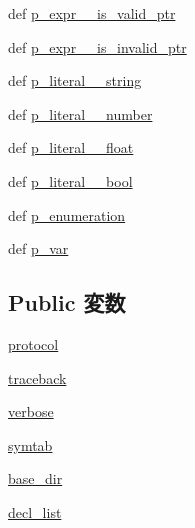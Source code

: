 \begin{DoxyCompactItemize}
\item 
def \hyperlink{classslicc_1_1parser_1_1SLICC_a4986f46b64e780add34eae04d1e4647e}{p\_\-expr\_\-\_\-is\_\-valid\_\-ptr}
\item 
def \hyperlink{classslicc_1_1parser_1_1SLICC_ae494093204d4dfecd7df80dc30f4e77c}{p\_\-expr\_\-\_\-is\_\-invalid\_\-ptr}
\item 
def \hyperlink{classslicc_1_1parser_1_1SLICC_afb56a210832d7241c7b30a71208f3e78}{p\_\-literal\_\-\_\-string}
\item 
def \hyperlink{classslicc_1_1parser_1_1SLICC_a7461ee14365de567c127d4ab8945d4b1}{p\_\-literal\_\-\_\-number}
\item 
def \hyperlink{classslicc_1_1parser_1_1SLICC_a96dd60ba8acf634524837855abefeebb}{p\_\-literal\_\-\_\-float}
\item 
def \hyperlink{classslicc_1_1parser_1_1SLICC_ab0a9703c95e703c1e2664fd532e19951}{p\_\-literal\_\-\_\-bool}
\item 
def \hyperlink{classslicc_1_1parser_1_1SLICC_a226b90fa8461df80629cd8b1c2864844}{p\_\-enumeration}
\item 
def \hyperlink{classslicc_1_1parser_1_1SLICC_af78da2861487d68d5e3d8709c1f10fda}{p\_\-var}
\end{DoxyCompactItemize}
\subsection*{Public 変数}
\begin{DoxyCompactItemize}
\item 
\hyperlink{classslicc_1_1parser_1_1SLICC_add2ec924c0f221790d7235ffb2e615cd}{protocol}
\item 
\hyperlink{classslicc_1_1parser_1_1SLICC_afb5ad7465a69b540dc0cbb233e561d6e}{traceback}
\item 
\hyperlink{classslicc_1_1parser_1_1SLICC_aa9e289eddb591991c9bc7321dc5b186b}{verbose}
\item 
\hyperlink{classslicc_1_1parser_1_1SLICC_a643766e045eab208f01ba6957b661e2a}{symtab}
\item 
\hyperlink{classslicc_1_1parser_1_1SLICC_a8ef3db3a5273b76c536881adb1ddeb63}{base\_\-dir}
\item 
\hyperlink{classslicc_1_1parser_1_1SLICC_a31dd93decfe243172100549e820d95f6}{decl\_\-list}
\end{DoxyCompactItemize}
